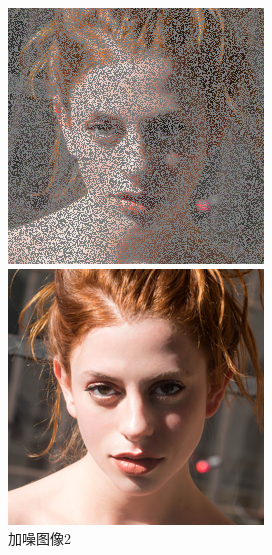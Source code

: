 \begin{figure}[H]
  \centering
  \begin{minipage}[b]{0.3\linewidth}
\includegraphics[width=\linewidth]{Picture/input/00001.png}
    \caption{加噪图像2}
    \label{noised image 2}
  \end{minipage}
  \hspace{0.1cm} %
   \begin{minipage}[b]{0.3\linewidth}
    \includegraphics[width=\linewidth]{Picture/label/00001.png}

\end{minipage}
\end{figure}
